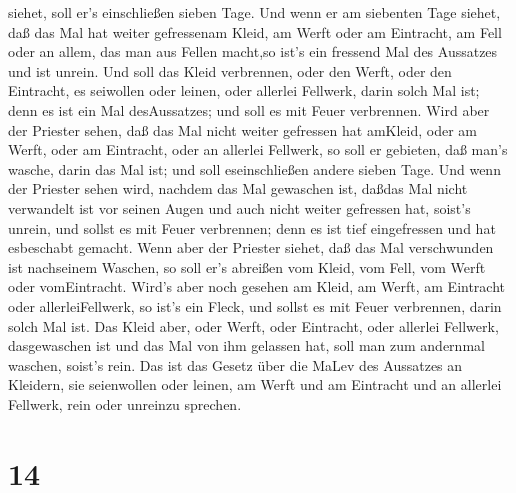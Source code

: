 siehet, soll er's einschließen sieben Tage.  Und wenn er am
siebenten Tage siehet, daß das Mal hat weiter gefressenam Kleid, am
Werft oder am Eintracht, am Fell oder an allem, das man aus Fellen
macht,so ist's ein fressend Mal des Aussatzes und ist unrein.
 Und soll das Kleid verbrennen, oder den Werft, oder den
Eintracht, es seiwollen oder leinen, oder allerlei Fellwerk, darin solch
Mal ist; denn es ist ein Mal desAussatzes; und soll es mit Feuer
verbrennen.  Wird aber der Priester sehen, daß das Mal
nicht weiter gefressen hat amKleid, oder am Werft, oder am Eintracht,
oder an allerlei Fellwerk,  so soll er gebieten, daß man's
wasche, darin das Mal ist; und soll eseinschließen andere sieben Tage.
 Und wenn der Priester sehen wird, nachdem das Mal
gewaschen ist, daßdas Mal nicht verwandelt ist vor seinen Augen und auch
nicht weiter gefressen hat, soist's unrein, und sollst es mit Feuer
verbrennen; denn es ist tief eingefressen und hat esbeschabt gemacht.
 Wenn aber der Priester siehet, daß das Mal verschwunden
ist nachseinem Waschen, so soll er's abreißen vom Kleid, vom Fell, vom
Werft oder vomEintracht.  Wird's aber noch gesehen am
Kleid, am Werft, am Eintracht oder allerleiFellwerk, so ist's ein Fleck,
und sollst es mit Feuer verbrennen, darin solch Mal ist. 
Das Kleid aber, oder Werft, oder Eintracht, oder allerlei Fellwerk,
dasgewaschen ist und das Mal von ihm gelassen hat, soll man zum
andernmal waschen, soist's rein.  Das ist das Gesetz über
die MaLev des Aussatzes an Kleidern, sie seienwollen oder leinen, am
Werft und am Eintracht und an allerlei Fellwerk, rein oder unreinzu
sprechen.

\hypertarget{section-13}{%
\section{14}\label{section-13}}

